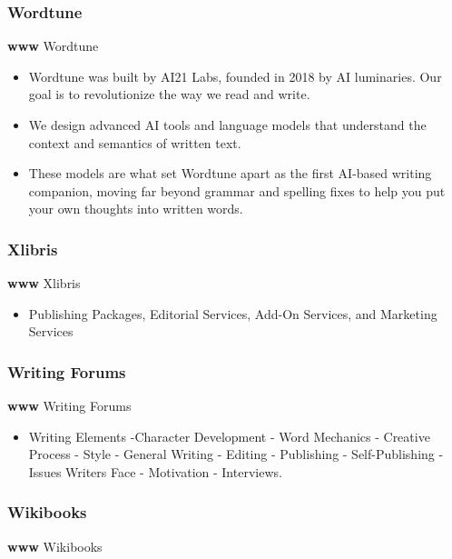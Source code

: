 \documentclass[
]{article}
\providecommand{\tightlist}{%
  \setlength{\itemsep}{0pt}\setlength{\parskip}{0pt}}
\begin{document}
\subsubsection{Wordtune}

\textbf{www} Wordtune

\begin{itemize}
\item
  Wordtune was built by AI21 Labs, founded in 2018 by AI luminaries. Our
  goal is to revolutionize the way we read and write.
\item
  We design advanced AI tools and language models that understand the
  context and semantics of written text.
\item
  These models are what set Wordtune apart as the first AI-based writing
  companion, moving far beyond grammar and spelling fixes to help you
  put your own thoughts into written words.
\end{itemize}

\subsubsection{Xlibris}

\textbf{www} Xlibris

\begin{itemize}
\tightlist
\item
  Publishing Packages, Editorial Services, Add-On Services, and
  Marketing Services
\end{itemize}

\subsubsection{Writing Forums}

\textbf{www} Writing Forums

\begin{itemize}
\tightlist
\item
  Writing Elements -Character Development - Word Mechanics - Creative
  Process - Style - General Writing - Editing - Publishing -
  Self-Publishing - Issues Writers Face - Motivation - Interviews.
\end{itemize}

\subsubsection{Wikibooks}

\textbf{www} Wikibooks
\end{document}
